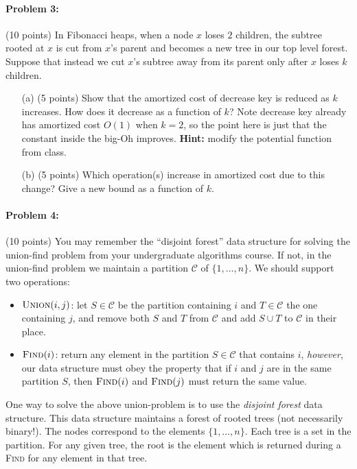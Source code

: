 \documentclass[12pt]{article}
\begin{document}
\paragraph{Problem 3:} (10 points) In Fibonacci heaps, when a node $x$ loses $2$ children, the subtree rooted at $x$ is cut from $x$'s parent and becomes a new tree in our top level forest. Suppose that instead we cut $x$'s subtree away from its parent only after $x$ loses $k$ children.
\begin{itemize}
\item[(a)] (5 points) Show that the amortized cost of decrease key is reduced as $k$ increases. How does it decrease as a function of $k$? Note decrease key already has amortized cost $O(1)$ when $k=2$, so the point here is just that the constant inside the big-Oh improves. \textbf{Hint:} modify the potential function from class.
\item[(b)] (5 points) Which operation(s) increase in amortized cost due to this change? Give a new bound as a function of $k$.
\end{itemize}

\paragraph{Problem 4:} (10 points) You may remember the ``disjoint forest'' data structure for solving the union-find problem from your undergraduate algorithms course. If not, in the union-find problem we maintain a partition $\mathcal{C}$ of $\{1,\ldots,n\}$. We should support two operations:
\begin{itemize} 
\item $\textsc{Union}(i, j)$: let $S\in\mathcal{C}$ be the partition containing $i$ and $T\in\mathcal{C}$ the one containing $j$, and remove both $S$ and $T$ from $\mathcal{C}$ and add $S\cup T$ to $\mathcal{C}$ in their place.
\item $\textsc{Find}(i)$: return any element in the partition $S\in\mathcal{C}$ that contains $i$, {\it however}, our data structure must obey the property that if $i$ and $j$ are in the same partition $S$, then $\textsc{Find}(i)$ and $\textsc{Find}(j)$ must return the same value.
\end{itemize}

One way to solve the above union-problem is to use the {\em disjoint forest} data structure. This data structure maintains a forest of rooted trees (not necessarily binary!). The nodes correspond to the elements $\{1,\ldots,n\}$. Each tree is a set in the partition. For any given tree, the root is the element which is returned during a \textsc{Find} for any element in that tree. 
\end{document}
